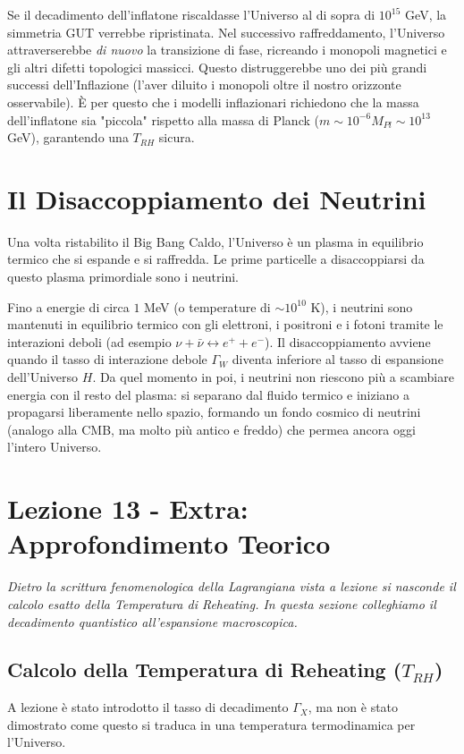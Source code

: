 \documentclass[11pt,a4paper]{report}
\begin{document}
Se il decadimento dell'inflatone riscaldasse l'Universo al di sopra di $10^{15}$ GeV, la simmetria GUT verrebbe ripristinata. Nel successivo raffreddamento, l'Universo attraverserebbe \textit{di nuovo} la transizione di fase, ricreando i monopoli magnetici e gli altri difetti topologici massicci. Questo distruggerebbe uno dei più grandi successi dell'Inflazione (l'aver diluito i monopoli oltre il nostro orizzonte osservabile). È per questo che i modelli inflazionari richiedono che la massa dell'inflatone sia "piccola" rispetto alla massa di Planck ($m \sim 10^{-6} M_{Pl} \sim 10^{13}$ GeV), garantendo una $T_{RH}$ sicura.

\section{Il Disaccoppiamento dei Neutrini}
Una volta ristabilito il Big Bang Caldo, l'Universo è un plasma in equilibrio termico che si espande e si raffredda. Le prime particelle a disaccoppiarsi da questo plasma primordiale sono i neutrini.

Fino a energie di circa $1$ MeV (o temperature di $\sim 10^{10}$ K), i neutrini sono mantenuti in equilibrio termico con gli elettroni, i positroni e i fotoni tramite le interazioni deboli (ad esempio $\nu + \bar{\nu} \leftrightarrow e^+ + e^-$). 
Il disaccoppiamento avviene quando il tasso di interazione debole $\Gamma_W$ diventa inferiore al tasso di espansione dell'Universo $H$. Da quel momento in poi, i neutrini non riescono più a scambiare energia con il resto del plasma: si separano dal fluido termico e iniziano a propagarsi liberamente nello spazio, formando un fondo cosmico di neutrini (analogo alla CMB, ma molto più antico e freddo) che permea ancora oggi l'intero Universo.


\newpage
\section{Lezione 13 - Extra: Approfondimento Teorico}

\textit{Dietro la scrittura fenomenologica della Lagrangiana vista a lezione si nasconde il calcolo esatto della Temperatura di Reheating. In questa sezione colleghiamo il decadimento quantistico all'espansione macroscopica.}

\subsection{Calcolo della Temperatura di Reheating ($T_{RH}$)}
A lezione è stato introdotto il tasso di decadimento $\Gamma_X$, ma non è stato dimostrato come questo si traduca in una temperatura termodinamica per l'Universo.
\end{document}
